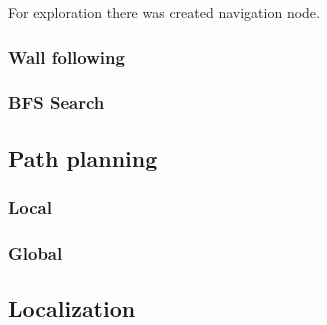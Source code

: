For exploration there was created navigation node. 

\subsubsection{Wall following}
\subsubsection{BFS Search}
\subsection{Path planning}
\subsubsection{Local}

\subsubsection{Global}


\subsection{Localization}
